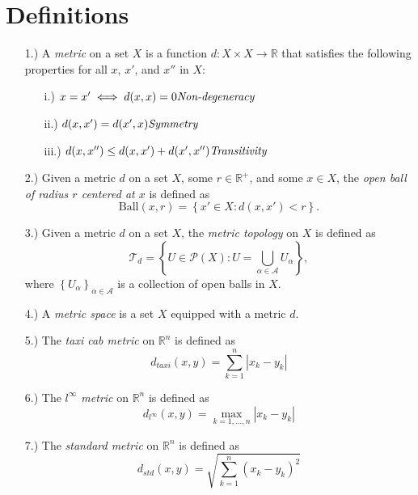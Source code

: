 \documentclass[12pt]{article}
\newcommand{\vertb}[1]{\left\vert#1\right\vert}      %
\newcommand{\braces}[1]{\left\{#1\right\}}           %
\newcommand{\R}{\mathbb{R}}
\begin{document}
\pagestyle{fancy}
\fancyhead{}

\normalsize

\section*{Definitions}
\begin{itemize}
    \item [1.)] A \textit{metric} on a set $X$ is a function
    $d:X \times X \to \R$ that satisfies the following properties for all $x$,
    $x'$, and $x''$ in $X$:
    \begin{itemize}
        \item [i.)] $x = x' \iff d(x,x) = 0 \hfill \textit{Non-degeneracy}$

        \item [ii.)] $d(x,x')=d(x',x) \hfill \textit{Symmetry}$

        \item [iii.)] $d(x,x'') \leq d(x,x') + d(x',x'') \hfill
            \textit{Transitivity}$
    \end{itemize}

    \item [2.)] Given a metric $d$ on a set $X$, some $r \in \R^+$, and some
    $x\in X$, the \textit{open ball of radius $r$ centered at $x$} is defined
    as
    \[ \text{Ball}(x,r) = \braces{x' \in X : d(x,x') < r} . \]

    \item [3.)] Given a metric $d$ on a set $X$, the \textit{metric topology}
    on $X$ is defined as
    \[
        \mathcal{T}_d
        = \braces{
            U \in \mathcal{P}(X)
            : U = \bigcup_{\alpha \in \mathcal{A}} U_\alpha
        }
        ,
    \]
    where $\braces{U_\alpha}_{\alpha \in \mathcal{A}}$ is a collection of open
    balls in $X$.

    \item [4.)] A \textit{metric space} is a set $X$ equipped with a metric
    $d$.

    \item [5.)] The \textit{taxi cab metric} on $\R^n$ is defined as
    \[ d_{taxi}(x,y) = \sum_{k=1}^n \vertb{x_k - y_k} \]

    \item [6.)] The \textit{$l^\infty$ metric} on $\R^n$ is defined as
    \[ d_{l^\infty}(x,y) = \max_{k = 1, \dots, n} \vertb{x_k - y_k} \]

    \item [7.)] The \textit{standard metric} on $\R^n$ is defined as
    \[ d_{std}(x,y) = \sqrt{\sum_{k=1}^n (x_k - y_k)^2} \]


\end{itemize}
\end{document}

